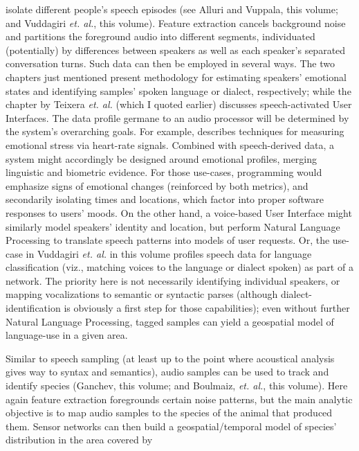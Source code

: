 {\begin{description}
isolate different people's speech episodes (see Alluri
and Vuppala, this volume; and Vuddagiri \textit{et. al.}, this volume).  Feature
extraction cancels background noise and partitions the foreground 
audio into different segments, individuated (potentially) by 
differences between speakers as well as each 
speaker's separated conversation turns.  Such data can 
then be employed in several ways.
The two chapters just mentioned present methodology for
estimating speakers' emotional states and
identifying samples' spoken language or dialect,
respectively; while the chapter by Teixera \textit{et. al.}
(which I quoted earlier) discusses
speech-activated User Interfaces.
\pseudoIndent{}
The data profile germane to 
an audio processor will be determined by the system's 
overarching goals.  For example, \cite{JongyoonChoi} describes 
techniques for measuring emotional stress via heart-rate signals.  
Combined with speech-derived data, a system might accordingly 
be designed around emotional profiles, merging linguistic and 
biometric evidence.  For those 
use-cases, programming would emphasize 
signs of emotional changes (reinforced by both metrics), 
and secondarily isolating times and locations, 
which factor into proper software responses to
users' moods.  
\pseudoIndent{}
On the other hand, a voice-based 
User Interface might similarly model speakers' identity 
and location, but perform Natural Language Processing 
to translate speech patterns into models of user 
requests.  Or, the use-case in Vuddagiri 
\textit{et. al.} in this volume profiles speech data 
for language classification (viz., matching voices to the 
language or dialect spoken) as part of a  network.  
The priority here is not necessarily identifying individual 
speakers, or mapping vocalizations to semantic or syntactic 
parses (although dialect-identification is obviously a first
step for those capabilities); even without further Natural Language Processing, 
tagged samples can yield a 
geospatial model of language-use in a given area. 
\item[Bioacoustic Sampling]  Similar to speech sampling 
(at least up to the point where acoustical analysis 
gives way to syntax and semantics), 
audio samples can be used to track and identify 
species (Ganchev, this volume; and Boulmaiz, \textit{et. al.},
this volume).  Here again feature 
extraction foregrounds certain noise patterns, but the 
main analytic objective is to map audio samples to 
the species of the animal that produced them.  
Sensor networks can then build a geospatial/temporal 
model of species' distribution in the area covered by 

\end{description}}
